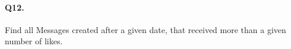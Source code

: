 \paragraph{Q12.}
Find all Messages created after a given date, that received more than a
given number of likes.
